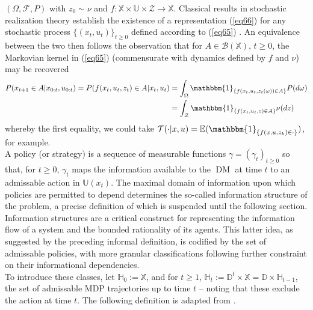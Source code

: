 \documentclass[12pt, oneside]{report}
\newcommand{\E}{\mathbb{E}}
\newcommand{\mbb}[1]{\mathbb{#1}}
\newcommand{\1}[1]{\mathbbm{1}_{\{#1\}}}
\newcommand{\mc}[1]{\mathcal{#1}}
\DeclareMathOperator{\DM}{DM} \DeclareMathOperator{\argmin}{argmin}
\theoremstyle{definition}
\begin{document}
$(\Omega,\mc{F},P)$ with $z_0\sim\nu$ and
$f:\mbb{X}\times\mbb{U}\times\mc{Z}\rightarrow\mbb{X}$. Classical results in
stochastic realization theory establish the existence of a representation
(\ref{eq66}) for any stochastic process $\{(x_t,u_t)\}_{t\geq 0}$ defined
according to (\ref{eq65}) \cite{Borkar_1993}. An equivalence between the two then
follows the observation that for $A\in\mc{B}(\mbb{X})$, $t\geq 0$, the Markovian
kernel in (\ref{eq65}) (commensurate with dynamics defined by $f$ and $\nu$) may
be recovered
\begin{align}
    P(x_{t+1}\in A|x_{0:t},u_{0:t})=P(f(x_t,u_t,z_t)\in A|x_t,u_t)
    &=\int_\Omega\1{f(x_t,u_t,z_t(\omega))\in A}P(d\omega)\\
    &=\int_\mc{Z}\1{f(x_t,u_t,z)\in A}\nu(dz)\label{eq68}
\end{align}
whereby the first equality, we could take $\mc{T}(\cdot|x,u)=\E(\1{f(x,u,z_k)\in
\cdot})$, for example.\\[5pt]
\indent A policy (or strategy) is a sequence of measurable functions
$\gamma=(\gamma_t)_{t\geq 0}$ so that, for $t\geq 0$, $\gamma_t$ maps the
information available to the $\DM$ at time $t$ to an admissable action in
$\mbb{U}(x_t)$. The maximal domain of information upon which policies are
permitted to depend determines the so-called information structure of the
problem, a precise definition of which is suspended until the following section.
Information structures are a critical construct for representing the information
flow of a system and the bounded rationality of its agents. This latter idea, as
suggested by the preceding informal definition, is codified by the set of
admissable policies, with more granular classifications following further
constraint on their informational dependencies.\\[5pt]
\indent To introduce these classes, let $\mbb{H}_0:=\mbb{X}$, and for $t\geq 1$,
$\mbb{H}_t:= \mbb{D}^t\times\mbb{X}=\mbb{D}\times \mbb{H}_{t-1}$, the set of
admissable MDP trajectories up to time $t$ -- noting that these exclude the
action at time $t$. The following definition is adapted from \cite[definition 2.3.2]{Hernandez-Lerma_Lasserre_1996}.
\end{document}
